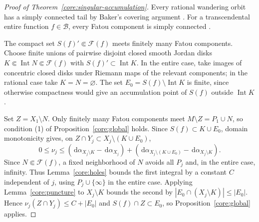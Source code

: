 \documentclass[10pt,a4paper]{amsart}
\newcommand{\Fat}{\mathcal F}
\newcommand{\dd}{\,\mathrm d}
\numberwithin{equation}{section}
\begin{document}
\begin{proof}[Proof of Theorem~\ref{core:singular-accumulation}]
Every rational wandering orbit has a simply connected tail by Baker's
covering argument \cite[Lemma~5.34, p.~90]{McMullen}.
For a transcendental entire function $f\in\mathcal B$, every Fatou
component is simply connected \cite[Proposition~3, p.~993]{EL}.

The compact set $S(f)'\Subset\Fat(f)$ meets finitely many Fatou
components. Choose finite unions of pairwise disjoint closed smooth
Jordan disks $K\Subset\operatorname{Int}N\Subset\Fat(f)$ with
$S(f)'\subset\operatorname{Int}K$. In the entire case, take images of
concentric closed disks under Riemann maps of the relevant components;
in the rational case take $K=N=\varnothing$. The set
$E_0=S(f)\setminus\operatorname{Int}K$ is finite, since otherwise
compactness would give an accumulation point of $S(f)$ outside
$\operatorname{Int}K$.

Set $Z=X_1\setminus N$. Only finitely many Fatou components meet
$M\setminus Z=P_1\cup N$, so condition (1) of
Proposition~\ref{core:global} holds. Since $S(f)\subset K\cup E_0$,
domain monotonicity gives, on
$Z\cap Y_j\subset X_j\setminus(K\cup E_0)$,
\[
 0\le\nu_j
 \le (\dd\alpha_{X_j\setminus K}-\dd\alpha_{X_j})
    +(\dd\alpha_{X_j\setminus(K\cup E_0)}
                              -\dd\alpha_{X_j\setminus K}).
\]
Since $N\Subset\Fat(f)$, a fixed neighborhood of $N$ avoids all $P_j$
and, in the entire case, infinity. Thus Lemma~\ref{core:holes} bounds
the first integral by a constant $C$ independent of $j$, using
$P_j\cup\{\infty\}$ in the entire case. Applying
Lemma~\ref{core:puncture} to $X_j\setminus K$ bounds the second by
$|E_0\cap(X_j\setminus K)|\le|E_0|$.
Hence $\nu_j(Z\cap Y_j)\le C+|E_0|$ and $S(f)\cap Z\subset E_0$,
so Proposition~\ref{core:global} applies.
\end{proof}
\end{document}
